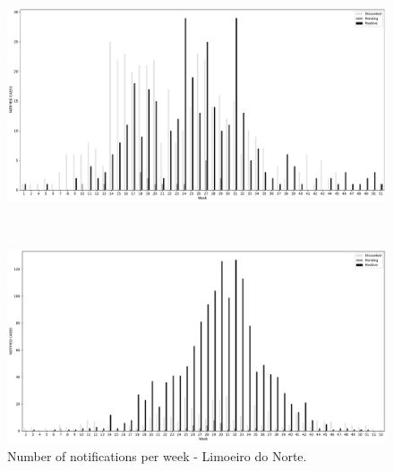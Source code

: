 \begin{figure}[ht!]
	\begin{minipage}[c]{.9\textwidth}
		\centering
		\includegraphics[scale=0.32]{images/cases-per-week-2019-Limoeiro do Norte.pdf}
	\end{minipage}
	\\
	\begin{minipage}[c]{.9\textwidth}
		\centering
		\includegraphics[scale=0.32]{images/cases-per-week-2020-Limoeiro do Norte.pdf}
	\end{minipage}
	\caption{\label{fig:cases-per-week-limoeiro} Number of notifications per week
		- Limoeiro do Norte.}
\end{figure}


